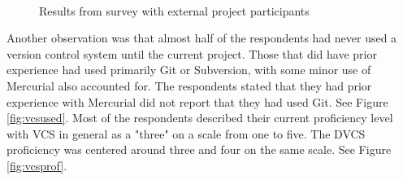 \documentclass{llncs}
\begin{document}
\begin{figure}
 \begin{center}
 \\
 \caption{Results from survey with external project participants}
 \end{center}
\end{figure}

Another observation was that almost half of the respondents had never
used a version control system until the current project. Those that
did have prior experience had used primarily Git or Subversion, with
some minor use of Mercurial also accounted for. The respondents
stated that they had prior experience with Mercurial did not report
that they had used Git. See Figure \ref{fig:vcsused}. Most of the
respondents described their current proficiency level with VCS in
general as a "three" on a scale from one to five. The DVCS proficiency
was centered around three and four on the same scale. See Figure
\ref{fig:vcsprof}.
\end{document}
